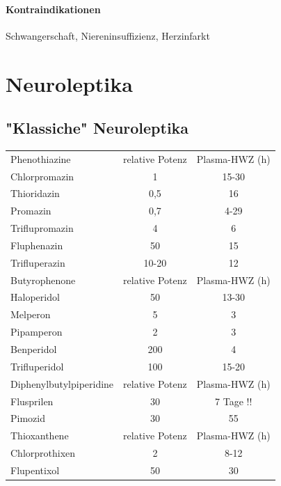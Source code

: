 \documentclass[10pt,a4paper]{report}
\begin{document}
\subsubsection{Kontraindikationen} %
\label{ssub:kontraindikationen}
Schwangerschaft, Niereninsuffizienz, Herzinfarkt
\chapter{Neuroleptika} %
\label{cha:neuroleptika}
\section{"Klassiche" Neuroleptika} %
\label{sec:}
\begin{tabularx}{\textwidth}{lcc}
Phenothiazine&relative Potenz&Plasma-HWZ (h)\\
Chlorpromazin&1&15-30\\
Thioridazin&0,5&16\\
Promazin&0,7&4-29\\
Triflupromazin&4&6\\
Fluphenazin&50&15\\
Trifluperazin&10-20&12\\
Butyrophenone&relative Potenz&Plasma-HWZ (h)\\
Haloperidol&50&13-30\\
Melperon&5&3\\
Pipamperon&2&3\\
Benperidol&200&4\\
Trifluperidol&100&15-20\\
Diphenylbutylpiperidine&relative Potenz&Plasma-HWZ (h)\\
Flusprilen&30&7 Tage !!\\
Pimozid&30&55\\
Thioxanthene&relative Potenz&Plasma-HWZ (h)\\
Chlorprothixen&2&8-12\\
Flupentixol&50&30\\
\end{tabularx}
\end{document}
